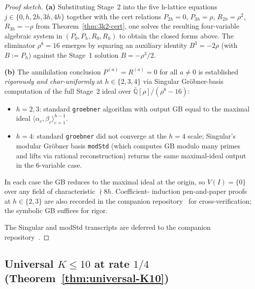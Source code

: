 \documentclass[11pt]{article}
\theoremstyle{definition}
\theoremstyle{remark}
\begin{document}
\begin{proof}[Proof sketch]
\textbf{(a)} Substituting Stage~2 into the five h-lattice equations
$j \in \{0, h, 2h, 3h, 4h\}$ together with the cert relations
$P_{2h} = 0$, $P_{3h} = \rho$, $R_{2h} = \rho^2$, $R_{3h} = -\rho$ from
Theorem~\ref{thm:3k2-cert}, one solves the resulting four-variable
algebraic system in $(P_0, P_h, R_0, R_h)$ to obtain the closed forms above.
The eliminator $\rho^8 = 16$ emerges by squaring an auxiliary identity
$B^3 = -2\rho$ (with $B := P_h$) against the Stage~1 solution
$B = -\rho^3/2$.

\textbf{(b)} The annihilation conclusion $P^{(a)} = R^{(a)} = 0$ for
all $a \neq 0$ is established \emph{rigorously and char-uniformly} at
$h \in \{2, 3, 4\}$ via Singular Gr\"obner-basis computation of the full
Stage~2 ideal over $\bar{\mathbb{Q}}[\rho]/(\rho^8 - 16)$:
\begin{itemize}[nosep, leftmargin=1.2em]
\item $h = 2, 3$: standard \texttt{groebner} algorithm with output
 GB equal to the maximal ideal $\langle \alpha_c, \beta_c
 \rangle_{c = 1}^{h - 1}$.
\item $h = 4$: standard \texttt{groebner} did not converge at the
 $h = 4$ scale; Singular's modular Gr\"obner basis \texttt{modStd}
 (which computes GB modulo many primes and lifts via rational
 reconstruction) returns the same maximal-ideal output in the
 $6$-variable case.
\end{itemize}
In each case the GB reduces to the maximal ideal at the origin, so
$V(I) = \{0\}$ over any field of characteristic $\nmid 8h$. Coefficient-
induction pen-and-paper proofs at $h \in \{2, 3\}$ are also recorded
in the companion repository~\cite{CompanionRepo} for cross-verification;
the symbolic GB suffices for rigor.

The Singular and modStd transcripts are deferred to the companion
repository~\cite{CompanionRepo}.
\end{proof}

\subsection{Universal $K \leq 10$ at rate $1/4$ (Theorem~\ref{thm:universal-K10})}
\label{prf:thm:universal-K10}
\end{document}
